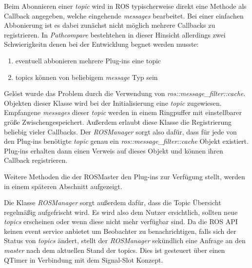 Beim Abonnieren einer \textit{topic} wird in ROS typischerweise direkt eine
Methode als Callback angegeben, welche eingehende \textit{messages} bearbeitet.
Bei einer einfachen Abbonierung ist es dabei zunächst nicht möglich mehrere
Callbacks zu registrieren.
In \textit{Pathcompare} bestehtehen in dieser Hinsicht allerdings zwei
Schwierigkeitn denen bei der Entwicklung begnet werden musste:

\begin{enumerate}
  \item eventuell abbonieren mehrere Plug-ins eine topic
  \item topics können von beliebigem \textit{message} Typ sein
\end{enumerate}

Gelöst wurde das Problem durch die Verwendung von
\textit{ros::message\_filter::cache}. Objekten dieser Klasse wird bei der
Initialisierung eine \textit{topic} zugewiesen. Empfangene \textit{messages}
dieser \textit{topic} werden in einem Ringpuffer mit einstellbarer größe Zwischengespeichert.
Außerdem erlaubt diese Klasse die Registrierung beliebig vieler Callbacks.
Der \textit{ROSManager} sorgt also dafür, dass für jede von den Plug-ins
benötigte \textit{topic} genau ein \textit{ros::message\_filter::cache} Objekt
existiert. Plug-ins erhalten dann einen Verweis auf dieses Objekt und können
ihren Callback registrieren.

Weitere Methoden die der ROSMaster den Plug-ins zur Verfügung stellt, werden in einem
späteren Abschnitt aufgezeigt.

Die Klasse \textit{ROSManager} sorgt außerdem dafür, dass die Topic Übersicht
regelmäßig aufgefrischt wird. Es wird also dem Nutzer ersichtlich, sollten neue
\textit{topics} erscheinen oder wenn diese nicht mehr verfügbar sind.
Da die \gls{ROS} \gls{API} keinen event service anbietet um Beobachter zu benachrichtigen,
falls sich der Status von \textit{topics} ändert, stellt der
\textit{ROSManager} sekündlich eine Anfrage an den \textit{master} nach dem
aktuellen Stand der topics.  Dies ist gesteuert über einen QTimer in Verbindung
mit dem Signal-Slot Konzept.


